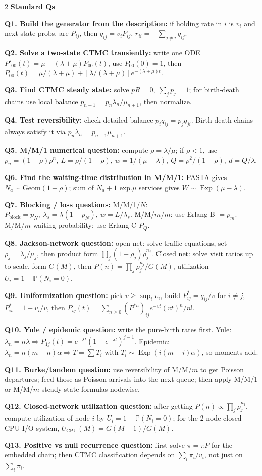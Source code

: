 \documentclass[10pt,fleqn]{article}
\newcommand{\PP}{\mathbb{P}}
\newcommand{\shead}[1]{\vspace{0.05ex}\textbf{\scriptsize #1}\par}
\newcommand{\qa}[2]{\textbf{#1} #2\par}
\DeclareMathOperator{\Exp}{Exp}
\begin{document}
\begin{multicols*}{2}
\shead{Standard Qs}
\qa{Q1. Build the generator from the description:}{if holding rate in \(i\) is \(v_i\) and next-state probs. are \(P_{ij}\), then \(q_{ij}=v_iP_{ij}\), \(r_{ii}=-\sum_{j\ne i}q_{ij}\).}
\qa{Q2. Solve a two-state CTMC transiently:}{write one ODE \(P'_{00}(t)=\mu-(\lambda+\mu)P_{00}(t)\), use \(P_{00}(0)=1\), then \(P_{00}(t)=\mu/(\lambda+\mu)+[\lambda/(\lambda+\mu)]e^{-(\lambda+\mu)t}\).}
\qa{Q3. Find CTMC steady state:}{solve \(pR=0,\ \sum_jp_j=1\); for birth-death chains use local balance \(p_{n+1}=p_n\lambda_n/\mu_{n+1}\), then normalize.}
\qa{Q4. Test reversibility:}{check detailed balance \(p_iq_{ij}=p_jq_{ji}\). Birth-death chains always satisfy it via \(p_n\lambda_n=p_{n+1}\mu_{n+1}\).}
\qa{Q5. M/M/1 numerical question:}{compute \(\rho=\lambda/\mu\); if \(\rho<1\), use \(p_n=(1-\rho)\rho^n,\ L=\rho/(1-\rho),\ w=1/(\mu-\lambda),\ Q=\rho^2/(1-\rho),\ d=Q/\lambda\).}
\qa{Q6. Find the waiting-time distribution in M/M/1:}{PASTA gives \(N_a\sim\text{Geom}(1-\rho)\); sum of \(N_a+1\) exp.\(\mu\) services gives \(W\sim\Exp(\mu-\lambda)\).}
\qa{Q7. Blocking / loss questions:}{M/M/1/\(N\): \(P_{\text{block}}=p_N,\ \lambda_s=\lambda(1-p_N),\ w=L/\lambda_s\). M/M/\(m\)/\(m\): use Erlang B \(=p_m\). M/M/\(m\) waiting probability: use Erlang C \(P_Q\).}
\qa{Q8. Jackson-network question:}{open net: solve traffic equations, set \(\rho_j=\lambda_j/\mu_j\), then product form \(\prod_j(1-\rho_j)\rho_j^{n_j}\). Closed net: solve visit ratios up to scale, form \(G(M)\), then \(P(n)=\prod_j\rho_j^{n_j}/G(M)\), utilization \(U_i=1-\PP(N_i=0)\).}
\qa{Q9. Uniformization question:}{pick \(v\ge\sup_i v_i\), build \(P^*_{ij}=q_{ij}/v\) for \(i\ne j\), \(P^*_{ii}=1-v_i/v\), then \(P_{ij}(t)=\sum_{n\ge0}(P^{*n})_{ij}e^{-vt}(vt)^n/n!\).}
\qa{Q10. Yule / epidemic question:}{write the pure-birth rates first. Yule: \(\lambda_n=n\lambda\Rightarrow P_{1j}(t)=e^{-\lambda t}(1-e^{-\lambda t})^{j-1}\). Epidemic: \(\lambda_n=n(m-n)\alpha\Rightarrow T=\sum T_i\) with \(T_i\sim\Exp(i(m-i)\alpha)\), so moments add.}
\qa{Q11. Burke/tandem question:}{use reversibility of M/M/\(m\) to get Poisson departures; feed those as Poisson arrivals into the next queue; then apply M/M/1 or M/M/\(m\) steady-state formulas nodewise.}
\qa{Q12. Closed-network utilization question:}{after getting \(P(n)\propto\prod_j\rho_j^{n_j}\), compute utilization of node \(i\) by \(U_i=1-\PP(N_i=0)\); for the 2-node closed CPU-I/O system, \(U_{\text{CPU}}(M)=G(M-1)/G(M)\).}
\qa{Q13. Positive vs null recurrence question:}{first solve \(\pi=\pi P\) for the embedded chain; then CTMC classification depends on \(\sum_i\pi_i/v_i\), not just on \(\sum_i\pi_i\).}

\end{multicols*}
\end{document}
